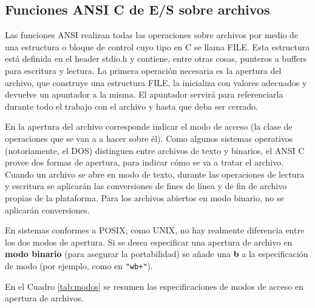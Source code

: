 \subsection{Funciones ANSI C de E/S sobre archivos}
\label{subsec:esarchivosansic}
Las funciones ANSI realizan todas las operaciones sobre archivos por medio de
una estructura o bloque de control cuyo tipo en C se llama FILE. Esta
estructura está definida en el header stdio.h y contiene, entre otras cosas,
punteros a buffers para escritura y lectura. La primera operación necesaria es
la apertura del archivo, que construye una estructura FILE, la inicializa con
valores adecuados y devuelve un apuntador a la misma. El apuntador servirá para
referenciarla durante todo el trabajo con el archivo y hasta que deba ser
cerrado.

En la apertura del archivo corresponde indicar el modo de acceso (la clase de
operaciones que se van a a hacer sobre él). Como algunos sistemas operativos
(notoriamente, el DOS) distinguen entre archivos de texto y binarios, el ANSI C
provee dos formas de apertura, para indicar cómo se va a tratar el archivo.
Cuando un archivo se abre en modo de texto, durante las operaciones de lectura
y escritura se aplicarán las conversiones de fines de línea y de fin de archivo
propias de la plataforma. Para los archivos abiertos en modo binario, no se
aplicarán conversiones.

En sistemas conformes a POSIX, como UNIX, no hay realmente diferencia entre los
dos modos de apertura. Si se desea especificar una apertura de archivo en \textbf{modo
binario} (para asegurar la portabilidad) se añade una \textbf{b} a la especificación de
modo (por ejemplo, como en \lstinline{"wb+"}).

En el Cuadro \ref{tab:modos} se resumen las especificaciones de modos de acceso en
apertura de archivos.

